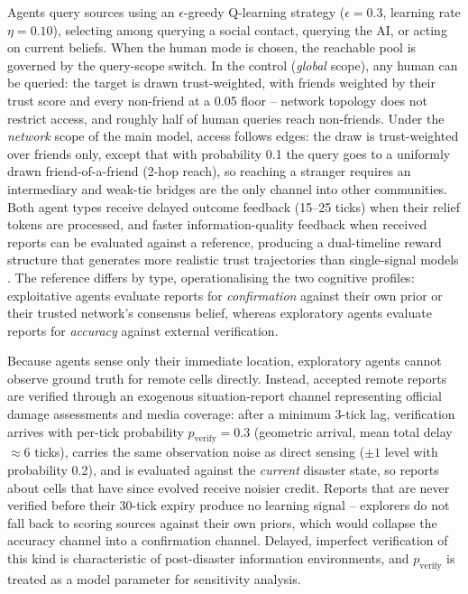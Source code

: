 \documentclass[sn-apacite]{sn-jnl}
\begin{document}
Agents query sources using an $\epsilon$-greedy Q-learning strategy ($\epsilon = 0.3$, learning rate $\eta = 0.10$), selecting among querying a social contact, querying the AI, or acting on current beliefs. When the human mode is chosen, the reachable pool is governed by the query-scope switch. In the control (\emph{global} scope), any human can be queried: the target is drawn trust-weighted, with friends weighted by their trust score and every non-friend at a 0.05 floor -- network topology does not restrict access, and roughly half of human queries reach non-friends. Under the \emph{network} scope of the main model, access follows edges: the draw is trust-weighted over friends only, except that with probability 0.1 the query goes to a uniformly drawn friend-of-a-friend (2-hop reach), so reaching a stranger requires an intermediary and weak-tie bridges are the only channel into other communities. Both agent types receive delayed outcome feedback (15--25 ticks) when their relief tokens are processed, and faster information-quality feedback when received reports can be evaluated against a reference, producing a dual-timeline reward structure that generates more realistic trust trajectories than single-signal models \citep{fu2023trust}. %
The reference differs by type, operationalising the two cognitive profiles: exploitative agents evaluate reports for \emph{confirmation} against their own prior or their trusted network's consensus belief, whereas exploratory agents evaluate reports for \emph{accuracy} against external verification.

Because agents sense only their immediate location, exploratory agents cannot observe ground truth for remote cells directly. Instead, accepted remote reports are verified through an exogenous situation-report channel representing official damage assessments and media coverage: after a minimum 3-tick lag, verification arrives with per-tick probability $p_{\text{verify}} = 0.3$ (geometric arrival, mean total delay $\approx 6$ ticks), carries the same observation noise as direct sensing ($\pm 1$ level with probability 0.2), and is evaluated against the \emph{current} disaster state, so reports about cells that have since evolved receive noisier credit. Reports that are never verified before their 30-tick expiry produce no learning signal -- explorers do not fall back to scoring sources against their own priors, which would collapse the accuracy channel into a confirmation channel. Delayed, imperfect verification of this kind is characteristic of post-disaster information environments, and $p_{\text{verify}}$ is treated as a model parameter for sensitivity analysis.
\end{document}

